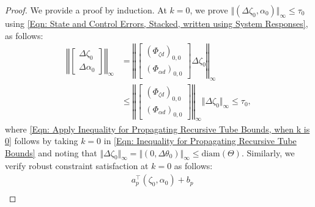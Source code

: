\documentclass[letterpaper, 10 pt, conference]{ieeeconf}
\newcommand{\?}{\stackrel{?}{=}}
\newcommand{\param}{\theta}
\newcommand{\paramSet}{\Theta}
\newcommand{\paramError}{\Delta\param}
\newcommand{\ratePGDError}{\Delta\ratePGD}
\newcommand{\disturbance}{d}
\newcommand{\ratePGD}{\alpha}
\newcommand{\systemResponse}{\Phi}
\newcommand{\state}{\zeta}
\newcommand{\stateError}{\Delta\state}
\newcommand{\tubeSize}{\tau}
\newcommand{\diam}{\text{diam}}
\newcommand{\ratePGDBoundSlope}{a}
\newcommand{\ratePGDBoundOffset}{b}
\begin{document}
\begin{proof}
We provide a proof by induction.
At $k = 0$, we prove $\Vert (\stateError_0, \ratePGD_0) \Vert_\infty \leq \tubeSize_0$ using \eqref{Eqn: State and Control Errors, Stacked, written using System Responses}, as follows:
{
\setlength{\abovedisplayskip}{3.5pt}
\setlength{\belowdisplayskip}{3.5pt}
\begin{align} \nonumber
    \left\Vert 
    \begin{bmatrix}
        \stateError_0 \\
        \ratePGDError_0
    \end{bmatrix}
    \right\Vert_\infty &= \left\Vert 
    \begin{bmatrix}
        (\systemResponse_{\state \disturbance})_{0, 0} \\
        (\systemResponse_{\ratePGD \disturbance})_{0, 0}
    \end{bmatrix}
    \stateError_0
    \right\Vert_\infty \\
    \label{Eqn: Apply Inequality for Propagating Recursive Tube Bounds, when k is 0}
    &\leq \left\Vert 
    \begin{bmatrix}
        (\systemResponse_{\state \disturbance})_{0, 0} \\
        (\systemResponse_{\ratePGD \disturbance})_{0, 0}
    \end{bmatrix}
    \right\Vert_\infty 
    \Vert \stateError_0 \Vert_\infty
    \leq \tubeSize_0,
\end{align}
}
\hspace{-1mm}where \eqref{Eqn: Apply Inequality for Propagating Recursive Tube Bounds, when k is 0} follows by taking $k = 0$ in \eqref{Eqn: Inequality for Propagating Recursive Tube Bounds} and noting that $\Vert \stateError_0 \Vert_\infty = \Vert (0, \paramError_0) \Vert_\infty \leq \diam(\paramSet)$. 
Similarly, we verify robust constraint satisfaction at $k = 0$ as follows:
{
\setlength{\abovedisplayskip}{3.5pt}
\setlength{\belowdisplayskip}{3.5pt}
\begin{align} \nonumber
    &\ratePGDBoundSlope_p^\top (\state_0, \ratePGD_0) + \ratePGDBoundOffset_p \\ \nonumber

\end{align}}
\end{proof}
\end{document}
